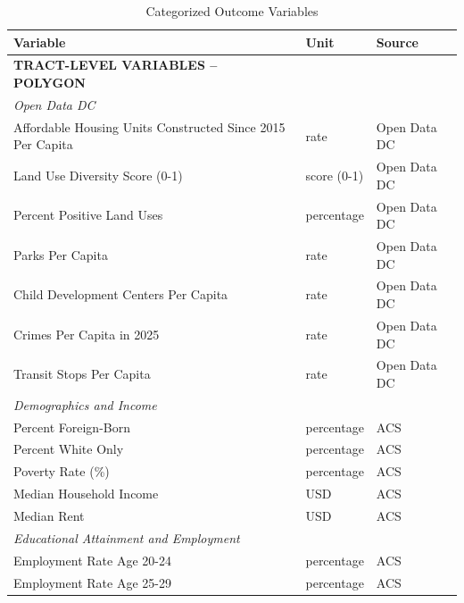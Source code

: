 \documentclass[
  letterpaper,
  DIV=11,
  numbers=noendperiod]{scrartcl}
\begin{document}
\begin{longtable}[]{@{}
  >{\raggedright\arraybackslash}p{}
  >{\raggedright\arraybackslash}p{}
  >{\raggedright\arraybackslash}p{}@{}}

\caption{\label{tbl-outcome-categories}Categorized Outcome Variables}

\tabularnewline

\toprule\noalign{}
\begin{minipage}[b]{\linewidth}\raggedright
Variable
\end{minipage} & \begin{minipage}[b]{\linewidth}\raggedright
Unit
\end{minipage} & \begin{minipage}[b]{\linewidth}\raggedright
Source
\end{minipage} \\
\midrule\noalign{}
\endhead
\bottomrule\noalign{}
\endlastfoot
\textbf{TRACT-LEVEL VARIABLES -- POLYGON} & & \\
\emph{Open Data DC} & & \\
Affordable Housing Units Constructed Since 2015 Per Capita & rate & Open
Data DC \\
Land Use Diversity Score (0-1) & score (0-1) & Open Data DC \\
Percent Positive Land Uses & percentage & Open Data DC \\
Parks Per Capita & rate & Open Data DC \\
Child Development Centers Per Capita & rate & Open Data DC \\
Crimes Per Capita in 2025 & rate & Open Data DC \\
Transit Stops Per Capita & rate & Open Data DC \\
\emph{Demographics and Income} & & \\
Percent Foreign-Born & percentage & ACS \\
Percent White Only & percentage & ACS \\
Poverty Rate (\%) & percentage & ACS \\
Median Household Income & USD & ACS \\
Median Rent & USD & ACS \\
\emph{Educational Attainment and Employment} & & \\
Employment Rate Age 20-24 & percentage & ACS \\
Employment Rate Age 25-29 & percentage & ACS \\

\end{longtable}
\end{document}
